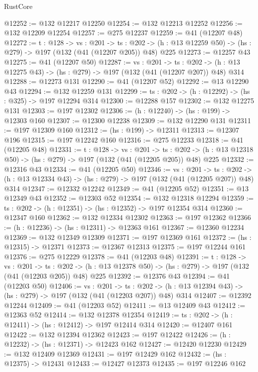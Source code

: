 \begin{lexlean}{RustCore}
\begin{coremodule}
@12252 := @132 @12217 @12250
@12254 := @132 @12213 @12252
@12256 := @132 @12209 @12254
@12257 := @275 @12237
@12259 := @41 (@12207 @48)
@12272 := {t : @128} ->
  {vs : @201} ->
  {ts : @202} -> (h : @13 @12259 @50) -> (hs : @279) -> @197 (@132 (@41 (@12207 @205)) @48) @225
@12273 := @12257 @43
@12275 := @41 (@12207 @50)
@12287 := {vs : @201} ->
  {ts : @202} -> (h : @13 @12275 @43) -> (hs : @279) -> @197 (@132 (@41 (@12207 @207)) @48) @314
@12288 := @12273 @131
@12290 := @41 (@12207 @52)
@12292 := @13 @12290 @43
@12294 := @132 @12259 @131
@12299 := {ts : @202} -> (h : @12292) -> (hs : @325) -> @197 @12294 @314
@12300 := @12288 @157
@12302 := @132 @12275 @131
@12303 := @197 @12302
@12306 := (h : @12240) -> (hs : @199) -> @12303 @160
@12307 := @12300 @12238
@12309 := @132 @12290 @131
@12311 := @197 @12309 @160
@12312 := (hs : @199) -> @12311
@12313 := @12307 @196
@12315 := @197 @12242 @160
@12316 := @275 @12233
@12318 := @41 (@12205 @48)
@12331 := {t : @128} ->
  {vs : @201} ->
  {ts : @202} -> (h : @13 @12318 @50) -> (hs : @279) -> @197 (@132 (@41 (@12205 @205)) @48) @225
@12332 := @12316 @43
@12334 := @41 (@12205 @50)
@12346 := {vs : @201} ->
  {ts : @202} -> (h : @13 @12334 @43) -> (hs : @279) -> @197 (@132 (@41 (@12205 @207)) @48) @314
@12347 := @12332 @12242
@12349 := @41 (@12205 @52)
@12351 := @13 @12349 @43
@12352 := @12303 @52
@12354 := @132 @12318 @12294
@12359 := {ts : @202} -> (h : @12351) -> (hs : @12352) -> @197 @12354 @314
@12360 := @12347 @160
@12362 := @132 @12334 @12302
@12363 := @197 @12362
@12366 := (h : @12236) -> (hs : @12311) -> @12363 @161
@12367 := @12360 @12234
@12369 := @132 @12349 @12309
@12371 := @197 @12369 @161
@12372 := (hs : @12315) -> @12371
@12373 := @12367 @12313
@12375 := @197 @12244 @161
@12376 := @275 @12229
@12378 := @41 (@12203 @48)
@12391 := {t : @128} ->
  {vs : @201} ->
  {ts : @202} -> (h : @13 @12378 @50) -> (hs : @279) -> @197 (@132 (@41 (@12203 @205)) @48) @225
@12392 := @12376 @43
@12394 := @41 (@12203 @50)
@12406 := {vs : @201} ->
  {ts : @202} -> (h : @13 @12394 @43) -> (hs : @279) -> @197 (@132 (@41 (@12203 @207)) @48) @314
@12407 := @12392 @12244
@12409 := @41 (@12203 @52)
@12411 := @13 @12409 @43
@12412 := @12363 @52
@12414 := @132 @12378 @12354
@12419 := {ts : @202} -> (h : @12411) -> (hs : @12412) -> @197 @12414 @314
@12420 := @12407 @161
@12422 := @132 @12394 @12362
@12423 := @197 @12422
@12426 := (h : @12232) -> (hs : @12371) -> @12423 @162
@12427 := @12420 @12230
@12429 := @132 @12409 @12369
@12431 := @197 @12429 @162
@12432 := (hs : @12375) -> @12431
@12433 := @12427 @12373
@12435 := @197 @12246 @162

\end{coremodule}
\end{lexlean}
